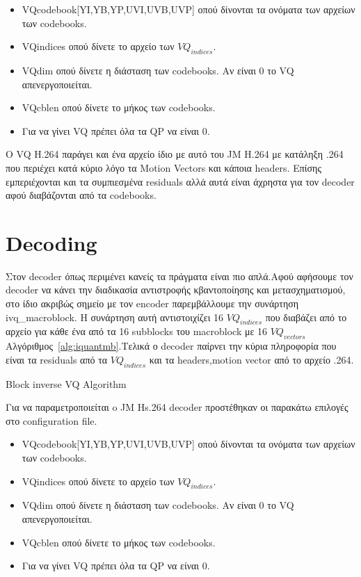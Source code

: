 \begin{itemize}
    \item VQcodebook[YI,YB,YP,UVI,UVB,UVP] οπού δίνονται τα ονόματα των αρχείων των codebooks.
    \item VQindices οπού δίνετε το αρχείο των $VQ_{indices}$.
    \item VQdim οπού δίνετε η διάσταση των codebooks. Αν είναι 0 το VQ απενεργοποιείται.
    \item VQcblen οπού δίνετε το μήκος των codebooks.
    \item Για να γίνει VQ πρέπει όλα τα QP να είναι 0.
\end{itemize}

\indent Ο VQ H.264 παράγει και ένα αρχείο ίδιο με αυτό του JM H.264 με κατάληξη .264 που περιέχει κατά κύριο λόγο τα Motion Vectors και κάποια headers. Επίσης εμπεριέχονται και τα συμπιεσμένα residuals αλλά αυτά είναι άχρηστα για τον decoder αφού διαβάζονται από τα codebooks.

\section{Decoding}
\label{section:sect53}

\indent Στον decoder όπως περιμένει κανείς τα πράγματα είναι πιο απλά.Αφού αφήσουμε τον decoder να κάνει την διαδικασία αντιστροφής κβαντοποίησης και μετασχηματισμού, στο ίδιο ακριβώς σημείο με τον encoder παρεμβάλλουμε την συνάρτηση ivq\_macroblock. Η συνάρτηση αυτή αντιστοιχίζει 16 $VQ_{indices}$ που διαβάζει από το αρχείο για κάθε ένα από τα 16 subblocks του macroblock με 16 $VQ_{vectors}$
Αλγόριθμος~\ref{alg:iquantmb}.Τελικά ο decoder παίρνει την κύρια πληροφορία που είναι τα residuals από τα $VQ_{indices}$ και τα headers,motion vector από το αρχείο .264.

\begin{algorithm}
\begin{algorithmic}[1]
\EndFor
\EndFunction
\end{algorithmic}
\caption{Block inverse VQ Algorithm}
\label{alg:iquantmb}
\end{algorithm}

\indent Για να παραμετροποιείται o JM Ηs.264 decoder προστέθηκαν οι παρακάτω επιλογές στο configuration file.

\begin{itemize}
    \item VQcodebook[YI,YB,YP,UVI,UVB,UVP] οπού δίνονται τα ονόματα των αρχείων των codebooks.
    \item VQindices οπού δίνετε το αρχείο των $VQ_{indices}$.
    \item VQdim οπού δίνετε η διάσταση των codebooks. Αν είναι 0 το VQ απενεργοποιείται.
    \item VQcblen οπού δίνετε το μήκος των codebooks.
    \item Για να γίνει VQ πρέπει όλα τα QP να είναι 0.
\end{itemize}